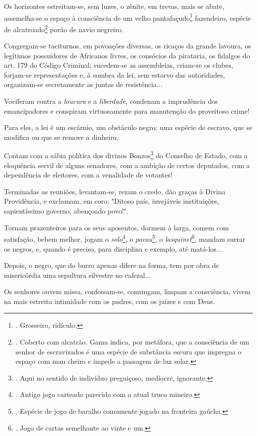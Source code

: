 Os horizontes estreitam-se, sem luzes, o zênite, em trevas, mais se
abate, assemelha-se o espaço à consciência de um velho
pantafaçudo\footnote{. Grosseiro, ridículo.} fazendeiro, espécie de
alcatroado\footnote{. Coberto com alcatrão. Gama indica, por metáfora,
  que a consciência de um senhor de escravizados é uma espécie de
  substância escura que impregna o espaço com mau cheiro e impede a
  passagem de luz solar.} porão de navio negreiro.

Congregam-se taciturnos, em povoações diversas, os ricaços da grande
lavoura, os legítimos possuidores de Africanos livres, os consócios da
pirataria, os fidalgos do art. 179 do Código Criminal; sucedem-se as
assembleias, criam-se os clubes, forjam-se representações e, à sombra da
lei, sem estorvo das autoridades, organizam-se secretamente as juntas de
resistência...

Vociferam contra a \emph{loucura} e a \emph{liberdade}, condenam a
imprudência dos emancipadores e conspiram virtuosamente para manutenção
do proveitoso crime!

Para eles, a lei é um escárnio, um obstáculo negro: uma espécie de
escravo, que se modifica ou que se remove a dinheiro.

Contam com a sábia política dos divinos Bonzos\footnote{. Aqui no
  sentido de indivíduo preguiçoso, medíocre, ignorante.} do Conselho de
Estado, com a eloquência servil de alguns senadores, com a ambição de
certos deputados, com a dependência de eleitores, com a venalidade de
votantes!

Terminadas as reuniões, levantam-se, rezam o credo, dão graças à Divina
Providência, e exclamam, em coro: "Ditoso país, invejáveis instituições,
sapientíssimo governo, abençoado povo!".

Tornam prazenteiros para os seus aposentos, dormem à larga, comem com
satisfação, bebem melhor, jogam o \emph{solo}\footnote{. Antigo jogo
  carteado parecido com o atual truco mineiro.}, o
\emph{pacau}\footnote{. Espécie de jogo de baralho comumente jogado na
  fronteira gaúcha.}, o \emph{lasquinet}\footnote{. Jogo de cartas
  semelhante ao vinte e um.}, mandam surrar os negros, e, quando é
preciso, para disciplina e exemplo, até matá-los...

Depois, o negro, que do burro apenas difere na forma, tem por obra de
misericórdia uma sepultura silvestre no cafezal...

Os senhores ouvem missa, confessam-se, comungam, limpam a consciência,
vivem na mais estreita intimidade com os padres, com os juízes e com
Deus.

